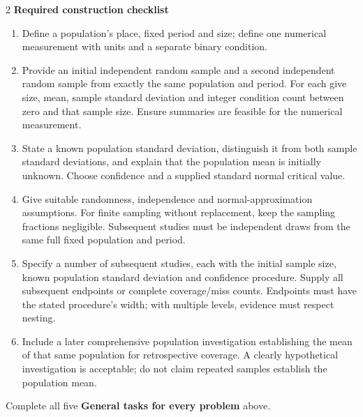 \begin{multicols}{2}
\textbf{Required construction checklist}
\begin{enumerate}
\item Define a population's place, fixed period and size; define one numerical measurement with units and a separate binary condition.
\item Provide an initial independent random sample and a second independent random sample from exactly the same population and period. For each give size, mean, sample standard deviation and integer condition count between zero and that sample size. Ensure summaries are feasible for the numerical measurement.
\item State a known population standard deviation, distinguish it from both sample standard deviations, and explain that the population mean is initially unknown. Choose confidence and a supplied standard normal critical value.
\item Give suitable randomness, independence and normal-approximation assumptions. For finite sampling without replacement, keep the sampling fractions negligible. Subsequent studies must be independent draws from the same full fixed population and period.
\item Specify a number of subsequent studies, each with the initial sample size, known population standard deviation and confidence procedure. Supply all subsequent endpoints or complete coverage/miss counts. Endpoints must have the stated procedure's width; with multiple levels, evidence must respect nesting.
\item Include a later comprehensive population investigation establishing the mean of that same population for retrospective coverage. A clearly hypothetical investigation is acceptable; do not claim repeated samples establish the population mean.
\end{enumerate}

\par\smallskip
Complete all five \textbf{General tasks for every problem} above.




\end{multicols}


